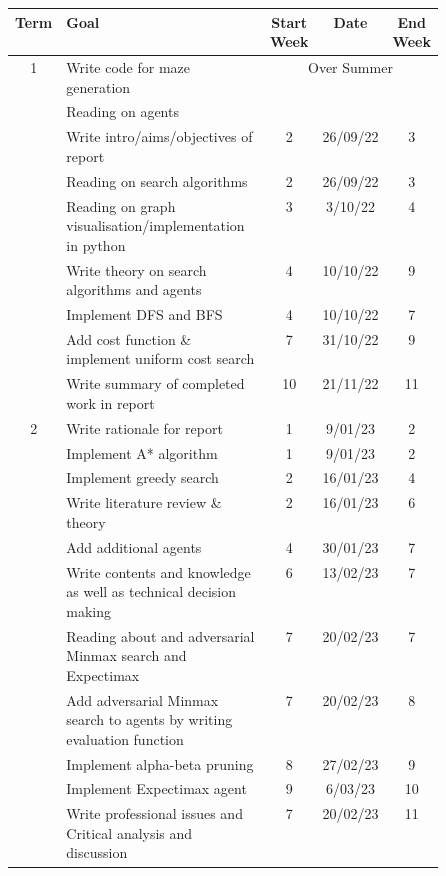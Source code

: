 \documentclass{article}
\begin{document}
\begin{center}
\begin{tabular}{||c|p{0.5\linewidth}|c|c|c||} 
\hline
Term & Goal & Start Week & Date & End Week \\ [0.5ex] 
\hline\hline
\multirow{8}{*}{1} & Write code for maze generation & \multicolumn{3}{c||}{\multirow{2}{*}{Over Summer}} \\\cline{2-2}
    & Reading on agents & \multicolumn{3}{c||}{}\\\cline{2-5}
    & Write intro/aims/objectives of report & 2 & 26/09/22 & 3 \\\cline{2-5}
    & Reading on search algorithms & 2 & 26/09/22 & 3 \\\cline{2-5}
    & Reading on graph visualisation/implementation in python  & 3 & 3/10/22 & 4 \\\cline{2-5}
    & Write theory on search algorithms and agents & 4 & 10/10/22 & 9 \\\cline{2-5}
    & Implement DFS and BFS & 4 & 10/10/22 & 7 \\\cline{2-5}
    & Add cost function \& implement uniform cost search & 7 & 31/10/22 & 9 \\\cline{2-5}
    & Write summary of completed work in report & 10 & 21/11/22 & 11\\\hline
\hline\hline
\multirow{11}{*}{2} & Write rationale for report & 1 & 9/01/23 & 2 \\\cline{2-5}
    & Implement A* algorithm & 1 & 9/01/23 & 2 \\\cline{2-5}
    & Implement greedy search & 2 & 16/01/23 & 4 \\\cline{2-5}
    & Write literature review \& theory & 2 & 16/01/23 & 6\\\cline{2-5}
    & Add additional agents & 4 & 30/01/23 & 7 \\\cline{2-5}
    & Write contents and knowledge  as well as technical decision making & 6 & 13/02/23 & 7 \\\cline{2-5}
    & Reading about and adversarial Minmax search and Expectimax & 7 & 20/02/23 & 7 \\\cline{2-5}
    & Add adversarial Minmax search to agents by writing evaluation function & 7 & 20/02/23 & 8 \\\cline{2-5}
    & Implement alpha-beta pruning & 8 & 27/02/23 & 9 \\\cline{2-5}
    & Implement Expectimax agent & 9 & 6/03/23 & 10 \\\cline{2-5}
    & Write professional issues and Critical analysis and discussion & 7 & 20/02/23 & 11\\\hline
    
\end{tabular}
\end{center}
\end{document}
